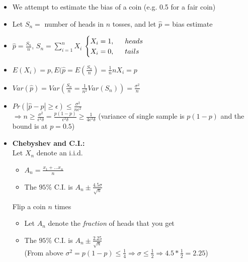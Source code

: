 \documentclass[a4paper]{article}
\begin{document}
\begin{itemize}
    \item We attempt to estimate the bias of a coin (e.g. 0.5 for a fair coin)
    \item Let $S_n = $ number of heads in $n$ tosses, and let $\hat{p}$ = bias estimate
    \item $\hat{p} = \frac{S_n}{n}$, $S_n = \sum_{i=1}^{n}X_i$ 
    $\begin{cases}
        X_i = 1,\indent heads\\
        X_i = 0, \indent tails
    \end{cases}$
    \item $E(X_i) = p, E(\hat{p} = E(\frac{S_n}{n}) = \frac{1}{n}nX_i = p$
    \item $Var(\hat{p}) = Var(\frac{S_n}{n} = \frac{1}{n^2}Var(S_n)) = \frac{\sigma^2}{n}$
    \item $Pr(|\hat{p} - p| \geq \epsilon) \leq \frac{\sigma^2}{n\epsilon^2}$\\
    $\Rightarrow n \geq \frac{\sigma^2}{\epsilon^2\delta} = \frac{p(1-p)}{\epsilon^2\delta} \geq \frac{1}{4\epsilon^2\delta}$ (variance of single sample is $p(1-p)$ and the bound is at $p = 0.5$)
    \item \textbf{Chebyshev and C.I.:}
    \\Let $X_n$ denote an i.i.d.
    \begin{itemize}
        \item $A_n = \frac{x_1 + ... x_n}{n}$
        \item The $95\%$ C.I. is $A_n \pm \frac{4.5 \sigma}{\sqrt n}$
    \end{itemize}

    Flip a coin $n$ times
    \begin{itemize}
        \item Let $A_n$ denote the \textit{fraction} of heads that you get
        \item The $95\%$ C.I. is $A_n \pm \frac{2.25}{\sqrt n}$\\
        (From above $\sigma^2 = p(1-p) \leq \frac{1}{4} \Rightarrow \sigma \leq \frac{1}{2} \Rightarrow 4.5 * \frac{1}{2} = 2.25$)
    \end{itemize}

    

\end{itemize}
\end{document}
